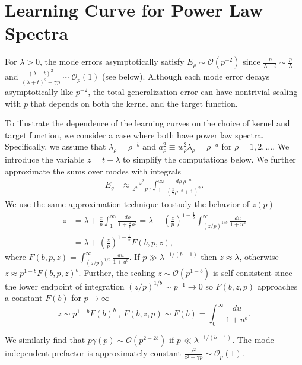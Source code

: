 \documentclass{article}
\begin{document}
\section{Learning Curve for Power Law Spectra}\label{SIPowerLaw}

For $\lambda > 0$, the mode errors asymptotically satisfy $E_\rho \sim \mathcal{O}(p^{-2})$ since $\frac{p}{\lambda+t} \sim \frac{p}{\lambda}$ and $\frac{(\lambda+t)^2}{(\lambda+t)^2-\gamma p} \sim \mathcal{O}_p(1)$ (see below). Although each mode error decays asymptotically like $p^{-2}$, the total generalization error can have nontrivial scaling with $p$ that depends on both the kernel and the target function.

To illustrate the dependence of the learning curves on the choice of kernel and target function, we consider a case where both have power law spectra. Specifically, we assume that $\lambda_\rho = \rho^{-b}$ and $a_\rho^2 \equiv \overline{w}_\rho^2 \lambda_\rho = \rho^{-a}$ for $\rho = 1,2,...$. We introduce the variable $z=t+\lambda$ to simplify the computations below. We further approximate the sums over modes with integrals
\begin{align}
    E_g &\approx \frac{z^2}{z^2- p \gamma}  \int_1^\infty \frac{d\rho \ \rho^{-a}}{\left(\frac{p}{z}  \rho^{-b} + 1 \right)^2}. 
\end{align}
%
We use the same approximation technique to study the behavior of $z(p)$
\begin{align}
    z &= \lambda + \frac{z}{p} \int_1^\infty \frac{d\rho}{1+\frac{z}{p} \rho^b} \nonumber
   = \lambda + \left(\frac{z}{p} \right)^{1-\frac{1}{b}} \int_{(z/p)^{1/b}}^\infty \frac{du}{1+u^b} \\
    & = \lambda + \left(\frac{z}{p} \right)^{1-\frac{1}{b}} F(b, p,z),
\end{align}
where $F(b,p,z) = \int_{(z/p)^{1/b}}^\infty \frac{du}{1+u^b}$. If $p \gg \lambda^{-1/(b-1)}$ then $z \approx \lambda$, otherwise $z \approx p^{1-b} F(b,p,z)^b$. Further, the scaling $z \sim \mathcal{O}(p^{1-b})$ is self-consistent since the lower endpoint of integration $(z/p)^{1/b} \sim p^{-1} \to 0$ so $F(b,z,p)$ approaches a constant $F(b)$ for $p \to \infty$
\begin{equation}
    z \sim p^{1-b} F(b)^b \ , \ F(b,z,p) \sim F(b) = \int_0^\infty \frac{du}{1+u^b}.
\end{equation}

We similarly find that $p \gamma(p) \sim \mathcal{O}(p^{2-2b})$ if $p \ll \lambda^{-1/(b-1)}$. The mode-independent prefactor is approximately constant $\frac{z^2}{z^2-\gamma p} \sim \mathcal{O}_p(1)$. 
\end{document}
